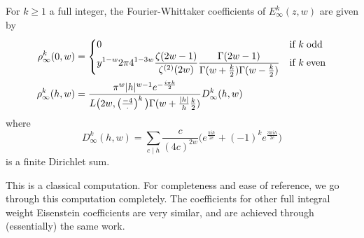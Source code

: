 \begin{claim}
  For $k \geq 1$ a full integer, the Fourier-Whittaker coefficients of $E_\infty^k(z,w)$
  are given by \begin{align}
    \rho_\infty^k(0,w) &= \begin{cases}
    0 & \text{if } k \; \text{odd}  \\
    \displaystyle y^{1-w} 2\pi 4^{1-3w} \frac{\zeta(2w-1)}{\zeta^{(2)}(2w)}
    \frac{\Gamma(2w-1)}{\Gamma(w + \frac{k}{2}) \Gamma(w - \frac{k}{2})}
    & \text{if } k \; \text{even}
    \end{cases}
    \\
    \rho_\infty^k(h,w) &= \frac{\pi^w  \lvert h \rvert^{w-1} e^{-\frac{i \pi k}{2}}}
    {L\big( 2w, \left(\frac{-4}{\cdot}\right)^k\big) \Gamma(w + \frac{\lvert h \rvert}{h}
    \frac{k}{2})} D_\infty^k(h,w)
  \end{align}
  where
  \begin{equation}
    D_\infty^k(h,w) = \sum_{c \mid h} \frac{c}{(4c)^{2w}}\Big( e^{\frac{\pi i h}{2c}} +
    (-1)^k e^{\frac{3\pi i h}{2c}}\Big)
\end{equation}
  is a finite Dirichlet sum.
\end{claim}

This is a classical computation.
For completeness and ease of reference, we go through this computation completely.
The coefficients for other full integral weight Eisenstein coefficients are very similar,
and are achieved through (essentially) the same work.

